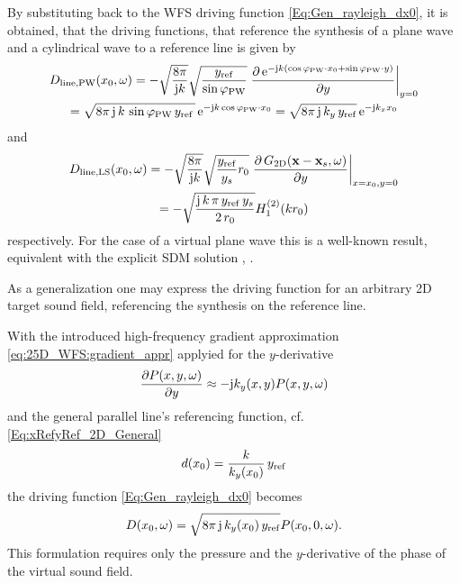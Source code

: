 By substituting back to the WFS driving function \eqref{Eq:Gen_rayleigh_dx0}, it is obtained, that the driving functions, that reference the synthesis of a plane wave and a cylindrical wave to a reference line is given by
\begin{multline}
\label{Eq:Plane_wave_ref_line}
D_\text{line,PW}(x_0,\omega)
=- \sqrt{\frac{8\pi}{\mathrm{j} k}}\sqrt{\frac{y_{\mathrm{ref}}}{\sin\varphi_\text{PW}}} \left.
\frac{\partial \, \mathrm{e}^{-\mathrm{j} k (\cos\varphi_\text{PW}\cdot x_0 + \sin\varphi_\text{PW}\cdot y)}}{\partial y} \right|_{y = 0}\\
=\sqrt{8\pi\,\mathrm{j}\,k\,\sin\varphi_\text{PW}\,y_{\mathrm{ref}}\,}\,\mathrm{e}^{-\mathrm{j} k \cos\varphi_\text{PW}\cdot x_0 }
=\sqrt{8\pi\,\mathrm{j}\,k_y\,y_{\mathrm{ref}}}\,\mathrm{e}^{-\mathrm{j} k_x x_0 }
\end{multline}
and
\begin{multline}
D_\text{line,LS}(x_0,\omega) 
=- \sqrt{\frac{8\pi}{\mathrm{j} k}}\sqrt{\frac{y_{\mathrm{ref}}}{y_s} r_0} \left.
\frac{\partial\,G_\text{2D}(\mathbf{x} -  \mathbf{x}_s,\omega)}{\partial y} \right|_{x=x_0, y = 0} \\
=- \sqrt{\frac{\mathrm{j}\,k\,\pi\,y_{\mathrm{ref}}\,y_s}{2\,r_0}}  H_1^{(2)}( k r_0 )
\end{multline}
respectively.
For the case of a virtual plane wave this is a well-known result, equivalent with the explicit SDM solution \cite[(29)]{Ahrens2010a}, \cite{Schultz2016:DAGA, Ahrens2012}.

As a generalization one may express the driving function for an arbitrary 2D target sound field, referencing the synthesis on the reference line.

With the introduced high-frequency gradient approximation \eqref{eq:25D_WFS:gradient_appr} applyied for the $y$-derivative
\begin{align}
\frac{\partial P(x,y,\omega)}{\partial y}  \approx  -\mathrm{j} k_y(x,y) P(x,y,\omega)
\end{align}
and the general parallel line's referencing function, cf.
\eqref{Eq:xRefyRef_2D_General}
\begin{align}
d(x_0) = \frac{k}{k_y(x_0)}\,y_{\mathrm{ref}}
\end{align}
the driving function \eqref{Eq:Gen_rayleigh_dx0} becomes
\begin{equation}
D(x_0,\omega) = \sqrt{8\pi\,\mathrm{j}\,k_y(x_0)\,y_{\mathrm{ref}} } P(x_0,0,\omega).
\end{equation} 
This formulation requires only the pressure and the $y$-derivative of the phase of the virtual sound field.

